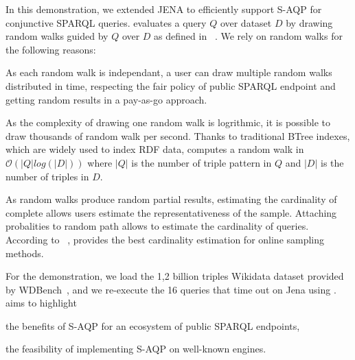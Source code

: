 In this demonstration, we extended JENA to efficiently support S-AQP
for conjunctive SPARQL queries. \NAME evaluates a query $Q$ over
dataset $D$ by drawing  random walks guided by $Q$ over $D$ as defined in
\WANDER~\cite{li2019wanderjoin}. We rely on random walks for the
following reasons:
%
\begin{inparaenum}[(i)]
%
\item As each random walk is independant, a
user can draw multiple random walks distributed in time, respecting
the fair policy of public SPARQL endpoint and getting random results
in a pay-as-go approach.
%
\item As the complexity of drawing one random walk is logrithmic, it is
possible to draw thousands of random walk per second. Thanks to
traditional BTree indexes, which are widely used to index RDF data,
\NAME computes a random walk in $\mathcal{O}(|Q|log(|D|))$ where $|Q|$
is the number of triple pattern in $Q$ and $|D|$ is the number of
triples in $D$.
%
\item As random walks produce random partial results, estimating the
cardinality of complete allows users estimate the representativeness
of the sample. Attaching probalities to random path allows to estimate
the cardinality of queries\cite{li2019wanderjoin}. According to
~\cite{DBLP:conf/sigmod/ParkKBKHH20}, \WANDER provides the best
cardinality estimation for online sampling methods.
\end{inparaenum}


%
%

For the demonstration, we load the 1,2 billion triples Wikidata dataset
provided by WDBench~\cite{angles2022wdbench}, and
we re-execute the 16 queries that time out on Jena using \NAME. %
%
\NAME aims to highlight
\begin{inparaenum}[(i)]
\item the benefits of S-AQP for an ecosystem of public SPARQL endpoints,
\item the feasibility of implementing S-AQP on well-known engines.
\end{inparaenum}

